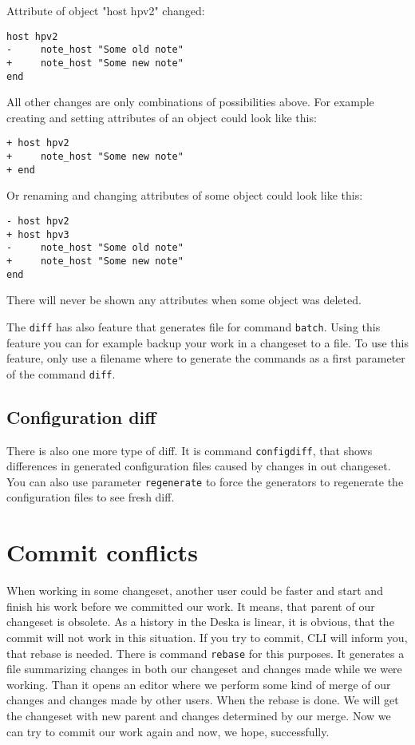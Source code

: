 \documentclass[deska]{subfiles}
\begin{document}
Attribute of object "host hpv2" changed:
\begin{verbatim}
host hpv2
-     note_host "Some old note"
+     note_host "Some new note"
end
\end{verbatim}

All other changes are only combinations of possibilities above. For example creating and setting attributes of an
object could look like this:
\begin{verbatim}
+ host hpv2
+     note_host "Some new note"
+ end
\end{verbatim}

Or renaming and changing attributes of some object could look like this:
\begin{verbatim}
- host hpv2
+ host hpv3
-     note_host "Some old note"
+     note_host "Some new note"
end
\end{verbatim}

There will never be shown any attributes when some object was deleted.

The {\tt diff} has also feature that generates file for command {\tt batch}. Using this feature you can for example backup
your work in a changeset to a file. To use this feature, only use a filename where to generate the commands as a first
parameter of the command {\tt diff}.

\subsection{Configuration diff}

There is also one more type of diff. It is command {\tt configdiff}, that shows differences in generated configuration files
caused by changes in out changeset. You can also use parameter {\tt regenerate} to force the generators to regenerate the
configuration files to see fresh diff.

\section{Commit conflicts}

When working in some changeset, another user could be faster and start and finish his work before we committed our work.
It means, that parent of our changeset is obsolete. As a history in the Deska is linear, it is obvious, that the commit
will not work in this situation. If you try to commit, CLI will inform you, that rebase is needed. There is command
{\tt rebase} for this purposes. It generates a file summarizing changes in both our changeset and changes made while
we were working. Than it opens an editor where we perform some kind of merge of our changes and changes made by other users.
When the rebase is done. We will get the changeset with new parent and changes determined by our merge. Now we can try to
commit our work again and now, we hope, successfully.
\end{document}
